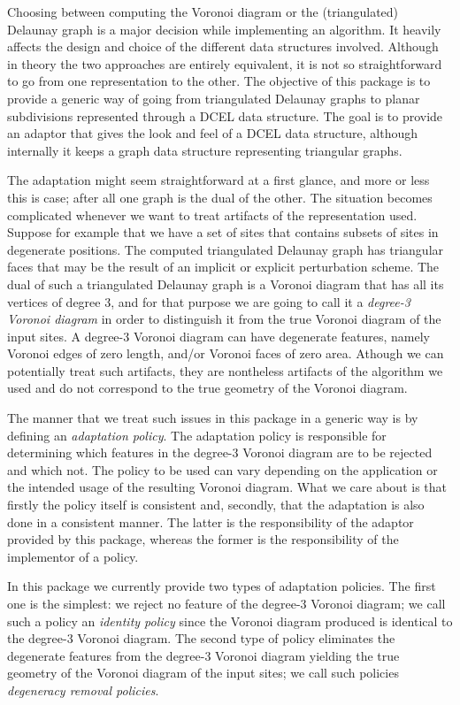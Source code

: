 Choosing between computing the Voronoi diagram or the (triangulated)
Delaunay graph is a major decision while implementing an algorithm. It
heavily affects the design and choice of the different data structures
involved. Although in theory the two approaches are entirely
equivalent, it is not so straightforward to go from one representation
to the other. The objective of this package is to provide a generic
way of going from triangulated Delaunay graphs to planar
subdivisions represented through a DCEL data structure. The goal is to
provide an adaptor that gives the look and feel of a DCEL data structure,
although internally it keeps a graph data structure representing
triangular graphs.

The adaptation might seem straightforward at a first glance, and more
or less this is case; after all one graph is the dual of the
other. The situation becomes complicated whenever we want to treat
artifacts of the representation used. Suppose for example that we have
a set of sites that contains subsets of sites in degenerate
positions. The computed triangulated Delaunay graph has triangular
faces that may be the result of an implicit or explicit perturbation
scheme. The dual of such a triangulated Delaunay graph is a Voronoi
diagram that has all its vertices of degree 3, and for that purpose we
are going to call it a \emph{degree-3 Voronoi diagram} in order to
distinguish it from the true Voronoi diagram of the input sites. A
degree-3 Voronoi diagram can have degenerate features, namely Voronoi
edges of zero length, and/or Voronoi faces of zero area. Athough we
can potentially treat such artifacts, they are nontheless artifacts of
the algorithm we used and do not correspond to the true geometry of
the Voronoi diagram.

The manner that we treat such issues in this package in a generic way
is by defining an \emph{adaptation policy}. The adaptation policy is
responsible for determining which features in the degree-3 Voronoi
diagram are to be rejected and which not. The policy to be used can
vary depending on the application or the intended usage of the
resulting Voronoi diagram. What we care about is that firstly the
policy itself is consistent and, secondly, that the adaptation is also
done in a consistent manner. The latter is the responsibility of the
adaptor provided by this package, whereas the former is the
responsibility of the implementor of a policy.

In this package we currently provide two types of adaptation
policies. The first one is the simplest: we reject no feature of the
degree-3 Voronoi diagram; we call such a policy an
\emph{identity policy} since the Voronoi diagram produced is identical
to the degree-3 Voronoi diagram. The second type of policy eliminates
the degenerate features from the degree-3 Voronoi diagram yielding
the true geometry of the Voronoi diagram of the input sites; we call
such policies \emph{degeneracy removal policies}.

